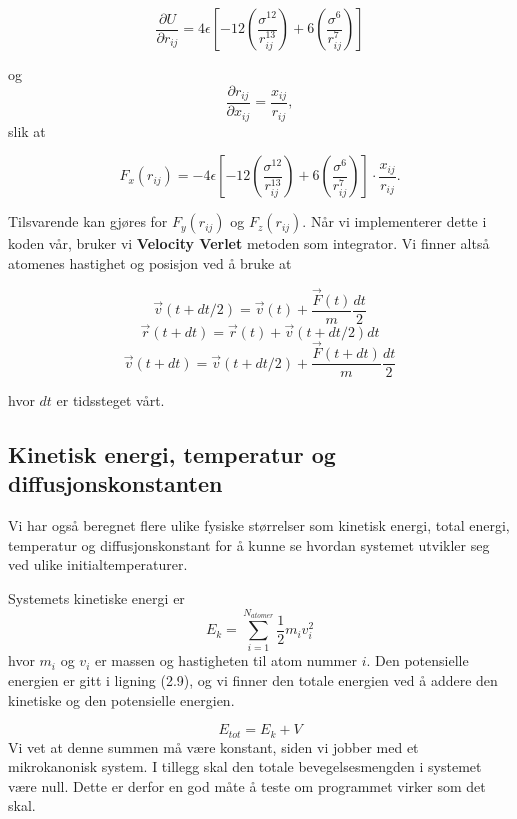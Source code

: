 \documentclass[paper=a4, fontsize=11pt]{scrartcl} %
\numberwithin{equation}{section} %
\numberwithin{figure}{section} %
\numberwithin{table}{section} %
\begin{document}
\begin{equation}
\frac{\partial U}{\partial r_{ij}} = 4 \epsilon \left[ -12 \left( \frac{\sigma^{12}}{r_{ij}^{13}} \right) + 6 \left( \frac{\sigma^6}{r_{ij}^7} \right) \right]
\end{equation}

og 
\begin{equation}
\frac{\partial r_{ij}}{\partial x_{ij}} = \frac{x_{ij}}{r_{ij}},
\end{equation}
slik at 

\begin{equation}
F_x (r_{ij}) = - 4 \epsilon \left[ -12 \left( \frac{\sigma^{12}}{r_{ij}^{13}} \right) + 6 \left( \frac{\sigma^6}{r_{ij}^7} \right) \right] \cdot \frac{x_{ij}}{r_{ij}}.
\end{equation}

Tilsvarende kan gjøres for $F_y(r_{ij})$ og $F_z(r_{ij})$. Når vi implementerer dette i koden vår, bruker vi \textbf{Velocity Verlet} metoden som integrator. Vi finner altså atomenes hastighet og posisjon ved å bruke at 

\[ \vec{v}(t + dt/2) = \vec{v}(t) + \frac{\vec{F}(t)}{m}\frac{dt}{2} \]
\[\vec{r}(t + dt) = \vec{r}(t) + \vec{v}(t + dt/2)dt \]
\[\vec{v}(t + dt) = \vec{v}(t + dt/2) + \frac{\vec{F}(t + dt)}{m} \frac{dt}{2} \]

hvor $dt$ er tidssteget vårt.


\subsection{Kinetisk energi, temperatur og diffusjonskonstanten}
Vi har også beregnet flere ulike fysiske størrelser som kinetisk energi, total energi, temperatur og diffusjonskonstant for å kunne se hvordan systemet utvikler seg ved ulike initialtemperaturer. 

Systemets kinetiske energi er 
\begin{equation}
E_k = \sum_{i=1}^{N_{atomer}} \frac{1}{2}m_iv_i^2
\end{equation}
hvor $m_i$ og $v_i$ er massen og hastigheten til atom nummer $i$. Den potensielle energien er gitt i ligning (2.9), og vi finner den totale energien ved å addere den kinetiske og den potensielle energien. 

\begin{equation}
E_{tot} =  E_k + V
\end{equation}
Vi vet at denne summen må være konstant, siden vi jobber med et mikrokanonisk system. I tillegg skal den totale bevegelsesmengden i systemet være null. Dette er derfor en god måte å teste om programmet virker som det skal.
\end{document}
